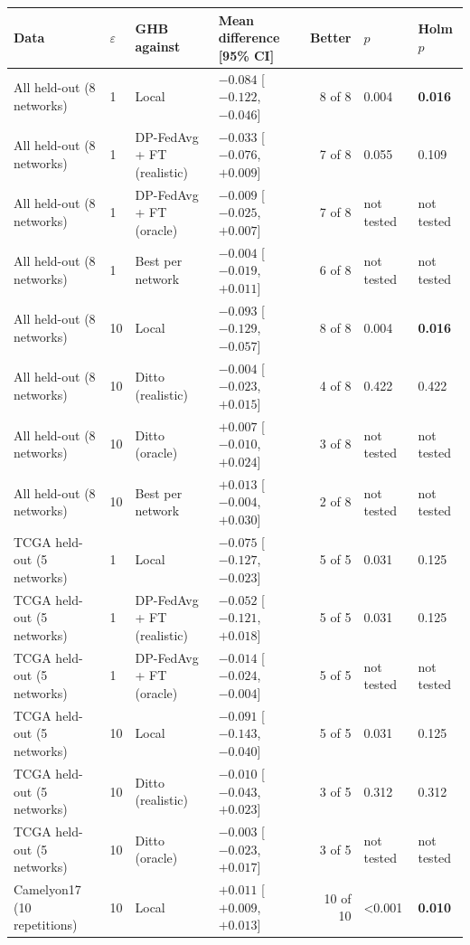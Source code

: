 \begin{tabular}{llllrll}
\toprule
Data & $\varepsilon$ & GHB against & Mean difference [95\% CI] & Better & $p$ & Holm $p$ \\
\midrule
All held-out (8 networks) & 1 & Local & $-0.084$ [$-0.122$, $-0.046$] & 8 of 8 & 0.004 & \textbf{0.016} \\
All held-out (8 networks) & 1 & DP-FedAvg + FT \cite{mcmahan2018learning} (realistic) & $-0.033$ [$-0.076$, $+0.009$] & 7 of 8 & 0.055 & 0.109 \\
All held-out (8 networks) & 1 & DP-FedAvg + FT \cite{mcmahan2018learning} (oracle) & $-0.009$ [$-0.025$, $+0.007$] & 7 of 8 & not tested & not tested \\
All held-out (8 networks) & 1 & Best per network & $-0.004$ [$-0.019$, $+0.011$] & 6 of 8 & not tested & not tested \\
All held-out (8 networks) & 10 & Local & $-0.093$ [$-0.129$, $-0.057$] & 8 of 8 & 0.004 & \textbf{0.016} \\
All held-out (8 networks) & 10 & Ditto \cite{li2021ditto} (realistic) & $-0.004$ [$-0.023$, $+0.015$] & 4 of 8 & 0.422 & 0.422 \\
All held-out (8 networks) & 10 & Ditto \cite{li2021ditto} (oracle) & $+0.007$ [$-0.010$, $+0.024$] & 3 of 8 & not tested & not tested \\
All held-out (8 networks) & 10 & Best per network & $+0.013$ [$-0.004$, $+0.030$] & 2 of 8 & not tested & not tested \\
TCGA held-out (5 networks) & 1 & Local & $-0.075$ [$-0.127$, $-0.023$] & 5 of 5 & 0.031 & 0.125 \\
TCGA held-out (5 networks) & 1 & DP-FedAvg + FT \cite{mcmahan2018learning} (realistic) & $-0.052$ [$-0.121$, $+0.018$] & 5 of 5 & 0.031 & 0.125 \\
TCGA held-out (5 networks) & 1 & DP-FedAvg + FT \cite{mcmahan2018learning} (oracle) & $-0.014$ [$-0.024$, $-0.004$] & 5 of 5 & not tested & not tested \\
TCGA held-out (5 networks) & 10 & Local & $-0.091$ [$-0.143$, $-0.040$] & 5 of 5 & 0.031 & 0.125 \\
TCGA held-out (5 networks) & 10 & Ditto \cite{li2021ditto} (realistic) & $-0.010$ [$-0.043$, $+0.023$] & 3 of 5 & 0.312 & 0.312 \\
TCGA held-out (5 networks) & 10 & Ditto \cite{li2021ditto} (oracle) & $-0.003$ [$-0.023$, $+0.017$] & 3 of 5 & not tested & not tested \\
Camelyon17 (10 repetitions) & 10 & Local & $+0.011$ [$+0.009$, $+0.013$] & 10 of 10 & <0.001 & \textbf{0.010} \\

\end{tabular}
